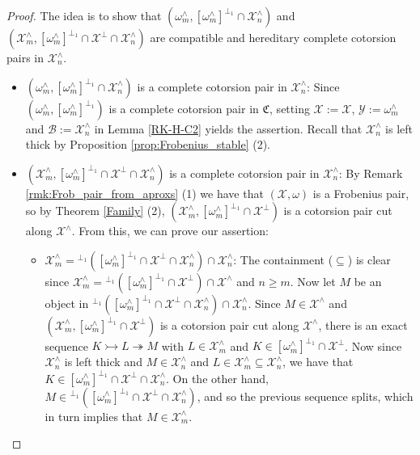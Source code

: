 \documentclass[10pt,reqno]{amsart}
\numberwithin{equation}{section}
\theoremstyle{remark}
\newcommand{\C}{\mathfrak{C}}
\newcommand{\X}{\mathcal{X}}
\begin{document}
\begin{proof}
The idea is to show that $(\omega^\wedge_m, [\omega^\wedge_m]^{\perp_1} \cap \mathcal{X}^\wedge_n)$ and $(\X^\wedge_m, [\omega^{\wedge}_m]^{\perp_1} \cap \X^\perp \cap \mathcal{X}^\wedge_n)$ are compatible and hereditary complete cotorsion pairs in $\mathcal{X}^\wedge_n$. 
\begin{itemize}
\item $(\omega^\wedge_m, [\omega^\wedge_m]^{\perp_1} \cap \mathcal{X}^\wedge_n)$ is a complete cotorsion pair in $\mathcal{X}^\wedge_n$: Since $(\omega^\wedge_m, [\omega^\wedge_m]^{\perp_1})$ is a complete cotorsion pair in $\C$, setting $\mathcal{X} := \mathcal{X}$, $\mathcal{Y} := \omega^\wedge_m$ and $\mathcal{B} := \mathcal{X}^\wedge_n$ in Lemma \ref{RK-H-C2} yields the assertion. Recall that $\mathcal{X}^\wedge_n$ is left thick by Proposition \ref{prop:Frobenius_stable} (2).

\item $(\X^\wedge_m, [\omega^{\wedge}_m]^{\perp_1} \cap \X^\perp \cap \mathcal{X}^\wedge_n)$ is a complete cotorsion pair in $\mathcal{X}^\wedge_n$: By Remark \ref{rmk:Frob_pair_from_aproxs} (1) we have that $(\X,\omega)$ is a Frobenius pair, so by Theorem \ref{Family} (2), $(\X^\wedge_m, [\omega^{\wedge}_m]^{\perp_1} \cap \X^\perp)$ is a cotorsion pair cut along $\mathcal{X}^\wedge$. From this, we can prove our assertion:
\begin{itemize}
\item $\mathcal{X}^\wedge_m = {}^{\perp_1}([\omega^\wedge_m]^{\perp_1} \cap \mathcal{X}^\perp \cap \mathcal{X}^\wedge_n) \cap \mathcal{X}^\wedge_n$: The containment ($\subseteq$) is clear since $\mathcal{X}^\wedge_m = {}^{\perp_1}([\omega^\wedge_m]^{\perp_1} \cap \mathcal{X}^\perp) \cap \mathcal{X}^\wedge$ and $n \geq m$. Now let $M$ be an object in ${}^{\perp_1}([\omega^\wedge_m]^{\perp_1} \cap \mathcal{X}^\perp \cap \mathcal{X}^\wedge_n) \cap \mathcal{X}^\wedge_n$. Since $M \in \mathcal{X}^\wedge$ and $(\X^\wedge_m, [\omega^{\wedge}_m]^{\perp_1} \cap \X^\perp)$ is a cotorsion pair cut along $\mathcal{X}^\wedge$, there is an exact sequence $K \rightarrowtail L \twoheadrightarrow M$ with $L \in \mathcal{X}^\wedge_m$ and $K \in [\omega^\wedge_m]^{\perp_1} \cap \mathcal{X}^\perp$. Now since $\mathcal{X}^\wedge_n$ is left thick and $M \in \mathcal{X}^\wedge_n$ and $L \in \mathcal{X}^\wedge_m \subseteq \mathcal{X}^\wedge_n$, we have that $K \in [\omega^\wedge_m]^{\perp_1} \cap \mathcal{X}^\perp \cap \mathcal{X}^\wedge_n$. On the other hand, $M \in {}^{\perp_1}([\omega^\wedge_m]^{\perp_1} \cap \mathcal{X}^\perp \cap \mathcal{X}^\wedge_n)$, and so the previous sequence splits, which in turn implies that $M \in \mathcal{X}^\wedge_m$.


\end{itemize}
\end{itemize}
\end{proof}
\end{document}
